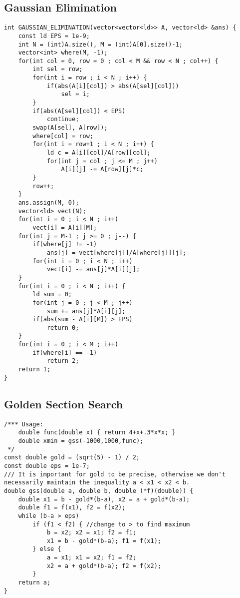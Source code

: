 \documentclass[landscape, 8pt, a4paper, oneside]{extarticle}
\begin{document}
\begin{multicols}{3}
\subsection{Gaussian Elimination}
\begin{verbatim}
int GAUSSIAN_ELIMINATION(vector<vector<ld>> A, vector<ld> &ans) {
    const ld EPS = 1e-9;
    int N = (int)A.size(), M = (int)A[0].size()-1;
    vector<int> where(M, -1);
    for(int col = 0, row = 0 ; col < M && row < N ; col++) {
        int sel = row;
        for(int i = row ; i < N ; i++) {
            if(abs(A[i][col]) > abs(A[sel][col]))
                sel = i;
        }
        if(abs(A[sel][col]) < EPS)
            continue;
        swap(A[sel], A[row]);
        where[col] = row;
        for(int i = row+1 ; i < N ; i++) {
            ld c = A[i][col]/A[row][col];
            for(int j = col ; j <= M ; j++)
                A[i][j] -= A[row][j]*c;
        }
        row++;
    }
    ans.assign(M, 0);
    vector<ld> vect(N);
    for(int i = 0 ; i < N ; i++)
        vect[i] = A[i][M];
    for(int j = M-1 ; j >= 0 ; j--) {
        if(where[j] != -1)
            ans[j] = vect[where[j]]/A[where[j]][j];
        for(int i = 0 ; i < N ; i++)
            vect[i] -= ans[j]*A[i][j];
    }
    for(int i = 0 ; i < N ; i++) {
        ld sum = 0;
        for(int j = 0 ; j < M ; j++)
            sum += ans[j]*A[i][j];
        if(abs(sum - A[i][M]) > EPS)
            return 0;
    }
    for(int i = 0 ; i < M ; i++)
        if(where[i] == -1)
            return 2;
    return 1;
}
\end{verbatim}
\subsection{Golden Section Search}
\begin{verbatim}
/*** Usage:
	double func(double x) { return 4+x+.3*x*x; }
	double xmin = gss(-1000,1000,func);
 */
const double gold = (sqrt(5) - 1) / 2;
const double eps = 1e-7;
/// It is important for gold to be precise, otherwise we don't necessarily maintain the inequality a < x1 < x2 < b.
double gss(double a, double b, double (*f)(double)) {
	double x1 = b - gold*(b-a), x2 = a + gold*(b-a);
	double f1 = f(x1), f2 = f(x2);
	while (b-a > eps)
		if (f1 < f2) { //change to > to find maximum
			b = x2; x2 = x1; f2 = f1;
			x1 = b - gold*(b-a); f1 = f(x1);
		} else {
			a = x1; x1 = x2; f1 = f2;
			x2 = a + gold*(b-a); f2 = f(x2);
		}
	return a;
}
\end{verbatim}

\end{multicols}
\end{document}
